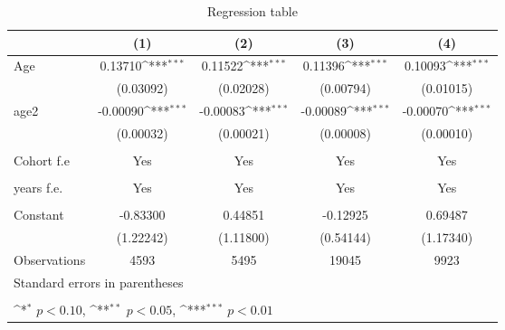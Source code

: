 \begin{table}[htbp]\centering
\def\sym#1{\ifmmode^{#1}\else\(^{#1}\)\fi}
\caption{Regression table \label{reg2}}
\begin{tabular}{l*{4}{c}}
\toprule
                    &\multicolumn{1}{c}{(1)}         &\multicolumn{1}{c}{(2)}         &\multicolumn{1}{c}{(3)}         &\multicolumn{1}{c}{(4)}         \\
\midrule
Age                 &     0.13710\sym{***}&     0.11522\sym{***}&     0.11396\sym{***}&     0.10093\sym{***}\\
                    &   (0.03092)         &   (0.02028)         &   (0.00794)         &   (0.01015)         \\
\addlinespace
age2                &    -0.00090\sym{***}&    -0.00083\sym{***}&    -0.00089\sym{***}&    -0.00070\sym{***}\\
                    &   (0.00032)         &   (0.00021)         &   (0.00008)         &   (0.00010)         \\

\\
Cohort f.e           &       Yes        &      Yes &       Yes        &      Yes \\
                            \\
\addlinespace
years f.e.            &       Yes         &       Yes   &       Yes        &      Yes       \\
                           \\
\addlinespace

Constant            &    -0.83300         &     0.44851         &    -0.12925         &     0.69487         \\
                    &   (1.22242)         &   (1.11800)         &   (0.54144)         &   (1.17340)         \\
\midrule
Observations        &        4593         &        5495         &       19045         &        9923         \\
\bottomrule
\multicolumn{5}{l}{\footnotesize Standard errors in parentheses}\\
\multicolumn{5}{l}{\footnotesize }\\
\multicolumn{5}{l}{\footnotesize \sym{*} \(p<0.10\), \sym{**} \(p<0.05\), \sym{***} \(p<0.01\)}\\
\end{tabular}
\end{table}
